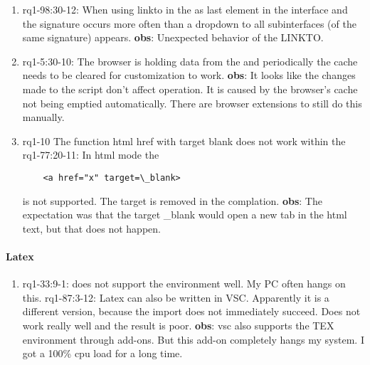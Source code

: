 \begin{enumerate}
    \item rq1-98:30-12: When using {linkto} in the  as last element in the interface and the signature occurs more often than a dropdown to all subinterfaces (of the same signature) appears.
    \newline\textbf{obs}: Unexpected behavior of the LINKTO.
    
    \item rq1-5:30-10: The browser is holding data from the  and periodically the cache needs to be cleared for customization to work.
    \newline\textbf{obs}: It looks like the changes made to the script don't affect operation.
    It is caused by the browser's cache not being emptied automatically.
    There are browser extensions to still do this manually.

    \item rq1-10 The function html href with target blank does not work within the 
    \newline rq1-77:20-11: In html mode the 
    \begin{lstlisting}
    <a href="x" target=\_blank>
    \end{lstlisting}
    is not supported.
    The target is removed in the complation.
    \newline\textbf{obs}: The expectation was that the target \_blank would open a new tab in the html text, but that does not happen.
    
\end{enumerate}

\paragraph{Latex}
\begin{enumerate}
    \item rq1-33:9-1:  does not support the  environment well.
    My PC often hangs on this.
    \newline rq1-87:3-12: Latex can also be written in VSC.
    Apparently it is a different version, because the import does not immediately succeed.
    Does not work really well and the result is poor.
    \newline\textbf{obs}: \acrlong{vsc} also supports the TEX environment through add-ons.
    But this add-on completely hangs my system.
    I got a 100\% cpu load for a long time. 


\end{enumerate}

